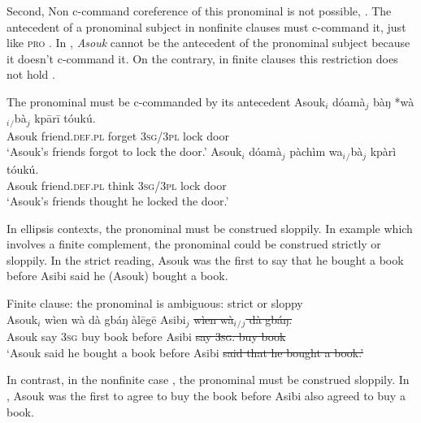 \documentclass[output=paper,colorlinks,citecolor=brown]{langscibook}
\begin{document}
Second, Non c-command coreference of this pronominal is not possible, . The antecedent of a pronominal subject in nonfinite clauses must c-command it, just like \textsc{pro} . In , {\it{Asouk}} cannot be the antecedent of the pronominal subject because it doesn't c-command it. On the contrary, in finite clauses this restriction does not hold . 

\ea%
    \label{ex:sulemana:19}
    The pronominal must be c-commanded by its antecedent
    \ea%
    \label{ex:sulemana:19a}
    \gll    Asouk$_i$  dóamà$_j$ bàŋ *wà$_i${}$_/$bà$_j$ kpārī tóukú.\\
            Asouk friend.\textsc{def.pl} forget \textsc{3sg/3pl} lock door\\
    \glt    `Asouk's friends forgot to lock the door.' 
    \ex%
    \label{ex:sulemana:19b}
    \gll    Asouk$_i$  dóamà$_j$ pàchìm  wa$_i${}$_/$bà$_j$ kpàrì tóukú.\\
            Asouk friend.\textsc{def.pl} think \textsc{3sg/3pl} lock door\\
    \glt    `Asouk's friends thought he locked the door.' 
    \z
\z

In ellipsis contexts, the pronominal must be construed sloppily. In example  which involves a finite complement, the pronominal could be construed strictly or sloppily. In the strict reading, Asouk was the first to say that he bought a book before Asibi said he (Asouk) bought a book. 


\ea%
    \label{ex:sulemana:20}
    Finite clause: the pronominal is ambiguous: strict or sloppy\\
    \gll    Asouk$_i$ wìen wà  dà gbáŋ àlēgē Asibi$_j$  {\sout{wìen wà$_i${}$_/${}$_j$  dà gbáŋ.}} \\
            Asouk say \textsc{3sg} buy book before Asibi {\sout{say \textsc{3sg}. buy book}}\\
    \glt    `Asouk said he bought a book before Asibi {\sout{said that he bought a book.'}} 
\z

In contrast, in the nonfinite case , the pronominal must be construed sloppily. In , Asouk was the first to agree to buy the book before Asibi also agreed to buy a book.
\end{document}
